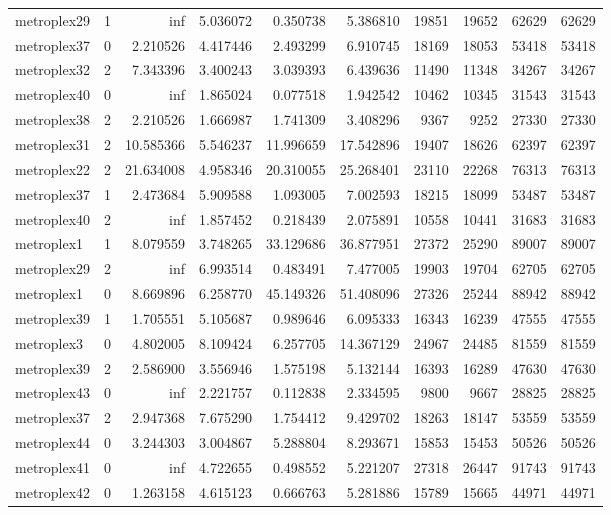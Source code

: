 \begin{longtable}{|l|r|r|r|r|r|r|r|r|r|}
metroplex29 & 1 & inf & 5.036072 & 0.350738 & 5.386810 & 19851 & 19652 & 62629 & 62629 \\
metroplex37 & 0 & 2.210526 & 4.417446 & 2.493299 & 6.910745 & 18169 & 18053 & 53418 & 53418 \\
metroplex32 & 2 & 7.343396 & 3.400243 & 3.039393 & 6.439636 & 11490 & 11348 & 34267 & 34267 \\
metroplex40 & 0 & inf & 1.865024 & 0.077518 & 1.942542 & 10462 & 10345 & 31543 & 31543 \\
metroplex38 & 2 & 2.210526 & 1.666987 & 1.741309 & 3.408296 & 9367 & 9252 & 27330 & 27330 \\
metroplex31 & 2 & 10.585366 & 5.546237 & 11.996659 & 17.542896 & 19407 & 18626 & 62397 & 62397 \\
metroplex22 & 2 & 21.634008 & 4.958346 & 20.310055 & 25.268401 & 23110 & 22268 & 76313 & 76313 \\
metroplex37 & 1 & 2.473684 & 5.909588 & 1.093005 & 7.002593 & 18215 & 18099 & 53487 & 53487 \\
metroplex40 & 2 & inf & 1.857452 & 0.218439 & 2.075891 & 10558 & 10441 & 31683 & 31683 \\
metroplex1 & 1 & 8.079559 & 3.748265 & 33.129686 & 36.877951 & 27372 & 25290 & 89007 & 89007 \\
metroplex29 & 2 & inf & 6.993514 & 0.483491 & 7.477005 & 19903 & 19704 & 62705 & 62705 \\
metroplex1 & 0 & 8.669896 & 6.258770 & 45.149326 & 51.408096 & 27326 & 25244 & 88942 & 88942 \\
metroplex39 & 1 & 1.705551 & 5.105687 & 0.989646 & 6.095333 & 16343 & 16239 & 47555 & 47555 \\
metroplex3 & 0 & 4.802005 & 8.109424 & 6.257705 & 14.367129 & 24967 & 24485 & 81559 & 81559 \\
metroplex39 & 2 & 2.586900 & 3.556946 & 1.575198 & 5.132144 & 16393 & 16289 & 47630 & 47630 \\
metroplex43 & 0 & inf & 2.221757 & 0.112838 & 2.334595 & 9800 & 9667 & 28825 & 28825 \\
metroplex37 & 2 & 2.947368 & 7.675290 & 1.754412 & 9.429702 & 18263 & 18147 & 53559 & 53559 \\
metroplex44 & 0 & 3.244303 & 3.004867 & 5.288804 & 8.293671 & 15853 & 15453 & 50526 & 50526 \\
metroplex41 & 0 & inf & 4.722655 & 0.498552 & 5.221207 & 27318 & 26447 & 91743 & 91743 \\
metroplex42 & 0 & 1.263158 & 4.615123 & 0.666763 & 5.281886 & 15789 & 15665 & 44971 & 44971 \\

\end{longtable}
